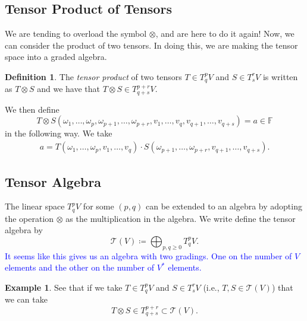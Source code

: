 \documentclass[12pt]{article}
\newcommand{\field}{\mathbb{F}}
\newcommand{\tspace}{T_q^pV}
\theoremstyle{definition}
\newtheorem{definition}{Definition}[section]
\newtheorem{example}{Example}[section]
\begin{document}
\subsection{Tensor Product of Tensors}
We are tending to overload the symbol $\otimes$, and are here to do it again!  Now, we can consider the product of two tensors.  In doing this, we are making the tensor space into a graded algebra. 

\begin{definition}
The \emph{tensor product} of two tensors $T\in \tspace$ and $S\in T_s^rV$ is written as $T\otimes S$ and we have that $T\otimes S \in T_{q+s}^{p+r}V$. 

We then define
\[
T\otimes S(\omega_1,\dots,\omega_p,\omega_{p+1},\dots,\omega_{p+r},v_1,\dots,v_q,v_{q+1},\dots,v_{q+s})=a\in \field
\]
in the following way.  We take
\begin{align*}
a=T(\omega_1,\dots,\omega_p,v_1,\dots,v_q)\cdot S(\omega_{p+1},\dots,\omega_{p+r},v_{q+1},\dots,v_{q+s}). 
\end{align*}
\end{definition}

\subsection{Tensor Algebra}
The linear space $\tspace$ for some $(p,q)$ can be extended to an algebra by adopting the operation $\otimes$ as the multiplication in the algebra.  We write define the tensor algebra by
\[
\mathcal{T}(V) \coloneqq \bigoplus_{p,q\geq 0} \tspace.
\]
\textcolor{blue}{It seems like this gives us an algebra with two gradings.  One on the number of $V$ elements and the other on the number of $V^*$ elements.} 

\begin{example}
See that if we take $T\in \tspace$ and $S\in T_s^r V$ (i.e., $T,S \in \mathcal{T}(V)$) that we can take
\[
T\otimes S \in T_{q+s}^{p+r} \subset \mathcal{T}(V).
\]
\end{example}
\end{document}
